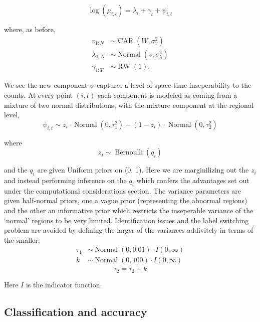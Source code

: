 \documentclass{article}
\begin{document}
\begin{equation}
\log(\mu_{i,t}) = \lambda_i + \gamma_t + \psi_{i,t}
\end{equation}

where, as before,
\begin{align}
v_{1:N} &\sim \operatorname{CAR}(W, \sigma_v^2) \\
\lambda_{1:N} &\sim \operatorname{Normal}(v, \sigma_\lambda^2) \\
\gamma_{1:T} &\sim \operatorname{RW}(1).
\end{align}

We see the new component $\psi$ captures a level of space-time inseperability to the counts. At every point $(i, t)$ each component is modeled as coming from a mixture of two normal distributions, with the mixture component at the regional level,
\begin{equation}
\psi_{i,t} \sim z_i \cdot \operatorname{Normal}(0, \tau_1^2) + (1 - z_i) \cdot \operatorname{Normal}(0, \tau_2^2)
\end{equation} 

where
\begin{equation}
  z_i \sim \operatorname{Bernoulli}(q_i)
\end{equation}

and the $q_i$ are given Uniform priors on (0, 1). Here we are marginilizing out the $z_i$ and instead performing inference on the $q_i$ which confers the advantages set out under the computational considerations section. The variance parameters are given half-normal priors, one a vague prior (representing the abnormal regions) and the other an informative prior which restricts the inseperable variance of the `normal' regions to be very limited. Identification issues and the label switching problem are avoided by defining the larger of the variances addivitely in terms of the smaller:
\begin{align}
  \tau_1 &\sim \operatorname{Normal}(0, 0.01) \cdot I(0, \infty) \\
  k &\sim \operatorname{Normal}(0, 100) \cdot I(0, \infty)
\end{align}
\begin{equation}
 \tau_2 = \tau_2 + k
\end{equation}

Here $I$ is the indicator function.

\subsection{Classification and accuracy}
\end{document}
